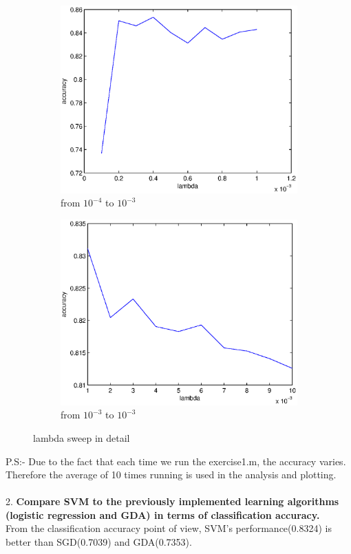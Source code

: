 \documentclass[12pt]{article}
\begin{document}
	\begin{figure}
		\begin{subfigure}{.5\textwidth}
			\centering
			\includegraphics[width=.9\linewidth]{lambda_n4ton3}
			\caption{from $10^{-4}$ to $10^{-3}$}
			\label{fig:lambda4to3}
		\end{subfigure}%
		\begin{subfigure}{.5\textwidth}
			\centering
			\includegraphics[width=.9\linewidth]{lambda_n3ton2}
			\caption{from $10^{-3}$ to $10^{-3}$}
			\label{fig:lambda3to2}
		\end{subfigure}
		\caption{lambda sweep in detail}
		\label{fig:fig}
	\end{figure}
	\noindent
	P.S:- Due to the fact that each time we run the exercise1.m, the accuracy varies. Therefore the average of 10 times running is used in the analysis and plotting.\\
	\\
	2. \textbf{Compare SVM to the previously implemented learning algorithms (logistic regression and GDA) in terms of classification accuracy.}\\
	From the classification accuracy point of view, SVM's performance(0.8324) is better than SGD(0.7039) and GDA(0.7353).\\
	
\end{document}
